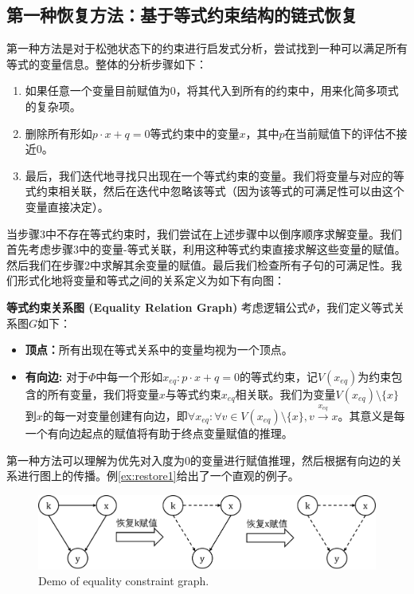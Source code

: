 \subsection{第一种恢复方法：基于等式约束结构的链式恢复}
第一种方法是对于松弛状态下的约束进行启发式分析，尝试找到一种可以满足所有等式的变量信息。整体的分析步骤如下：
\begin{enumerate}
    \item 如果任意一个变量目前赋值为0，将其代入到所有的约束中，用来化简多项式的复杂项。
    \item 删除所有形如$p \cdot x + q = 0$等式约束中的变量$x$，其中$p$在当前赋值下的评估不接近0。
    \item 最后，我们迭代地寻找只出现在一个等式约束的变量。我们将变量与对应的等式约束相关联，然后在迭代中忽略该等式（因为该等式的可满足性可以由这个变量直接决定）。
\end{enumerate}
当步骤3中不存在等式约束时，我们尝试在上述步骤中以倒序顺序求解变量。我们首先考虑步骤3中的变量-等式关联，利用这种等式约束直接求解这些变量的赋值。然后我们在步骤2中求解其余变量的赋值。最后我们检查所有子句的可满足性。我们形式化地将变量和等式之间的关系定义为如下有向图：
\begin{definition}{\textbf{等式约束关系图 (Equality Relation Graph)}}
考虑逻辑公式$\Phi$，我们定义等式关系图$G$如下：
\begin{itemize}
    \item \textbf{顶点：}所有出现在等式关系中的变量均视为一个顶点。
    \item \textbf{有向边:} 对于$\Phi$中每一个形如$x_{eq}: p \cdot x + q = 0$的等式约束，记$V(x_{eq})$为约束包含的所有变量，我们将变量$x$与等式约束$x_{eq}$相关联。我们为变量$V(x_{eq}) \setminus \{x\}$到$x$的每一对变量创建有向边，即$\forall x_{eq}: \forall v \in V(x_{eq}) \setminus \{x\}, v \xrightarrow{x_{eq}} x$。其意义是每一个有向边起点的赋值将有助于终点变量赋值的推理。
\end{itemize}
\end{definition}

第一种方法可以理解为优先对入度为0的变量进行赋值推理，然后根据有向边的关系进行图上的传播。例\ref{ex:restore1}给出了一个直观的例子。

\begin{figure}[t]
    \centering
    \includegraphics[width=\columnwidth]{Img/restore1.png}
     {Demo of equality constraint graph.}
\label{fig:restore1}
\end{figure}



